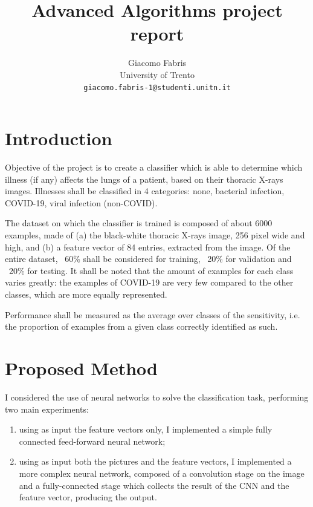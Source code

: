 \documentclass[10pt,a4paper,twocolumn]{article}
\begin{document}
\title{\textsf{Advanced Algorithms project report}}

\author{Giacomo Fabris\\
University of Trento\\
{\tt\small giacomo.fabris-1@studenti.unitn.it}
}

\maketitle

\section{Introduction}

Objective of the project is to create a classifier which is able to determine which illness (if any) affects the lungs of a patient, based on their thoracic X-rays images. Illnesses shall be classified in 4 categories: none, bacterial infection, COVID-19, viral infection (non-COVID).

The dataset on which the classifier is trained is composed of about 6000 examples, made of (a) the black-white thoracic X-rays image, 256 pixel wide and high, and (b) a feature vector of 84 entries, extracted from the image. Of the entire dataset, ~60\% shall be considered for training, ~20\% for validation and ~20\% for testing. It shall be noted that the amount of examples for each class varies greatly: the examples of COVID-19 are very few compared to the other classes, which are more equally represented.

Performance shall be measured as the average over classes of the sensitivity, i.e. the proportion of examples from a given class correctly identified as such. 

\section{Proposed Method}

I considered the use of neural networks to solve the classification task, performing two main experiments:
\begin{enumerate}
    \item using as input the feature vectors only, I implemented a simple fully connected feed-forward neural network;
    \item using as input both the pictures and the feature vectors, I implemented a more complex neural network, composed of a convolution stage on the image and a fully-connected stage which collects the result of the CNN and the feature vector, producing the output.
\end{enumerate}
\end{document}
